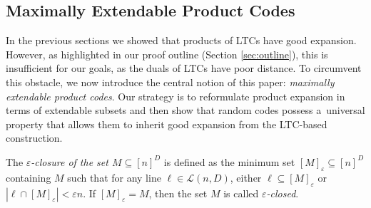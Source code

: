 \documentclass[conference]{IEEEtran}
\newcommand{\eps}{\varepsilon}
\theoremstyle{plain}
\theoremstyle{definition}
\theoremstyle{remark}
\begin{document}
\subsection{Maximally Extendable Product Codes}

In the previous sections we showed that products of LTCs have good expansion. However, as highlighted in our proof outline (Section \ref{sec:outline}), this is insufficient for our goals, as the duals of LTCs have poor distance. To circumvent this obstacle, we now introduce the central notion of this paper: \emph{maximally extendable product codes}. Our strategy is to reformulate product expansion in terms of extendable subsets and then show that random codes possess a~universal property that allows them to inherit good expansion from the LTC-based construction.


The \emph{$\eps$-closure of the set $M \subseteq [n]^D$} is defined as the minimum set $[M]_\eps \subseteq [n]^D$ containing $M$ such that for any line $\ell\in \mathcal{L}(n,D)$, either $\ell\subseteq [M]_\eps$ or $|\ell\cap [M]_\eps|<\eps n$. If $[M]_\eps=M$, then the set $M$ is called \emph{$\eps$-closed}.
\end{document}
